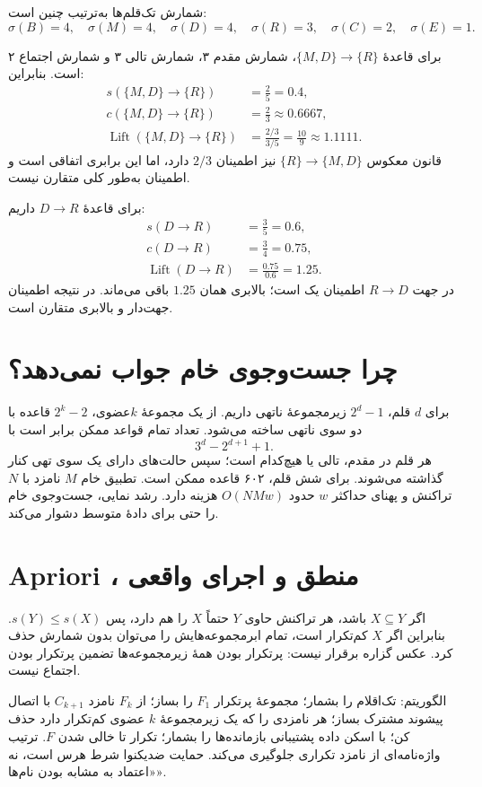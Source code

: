 شمارش تک‌قلم‌ها به‌ترتیب چنین است:
\[\sigma(B)=4,\quad\sigma(M)=4,\quad\sigma(D)=4,\quad\sigma(R)=3,\quad\sigma(C)=2,\quad\sigma(E)=1.\]

برای قاعدهٔ $\{M,D\}\to\{R\}$، شمارش مقدم ۳، شمارش تالی ۳ و شمارش اجتماع ۲ است. بنابراین:
\begin{align*}
s(\{M,D\}\to\{R\})&=\frac25=0.4,\\
c(\{M,D\}\to\{R\})&=\frac23\approx0.6667,\\
\operatorname{Lift}(\{M,D\}\to\{R\})&=\frac{2/3}{3/5}=\frac{10}{9}\approx1.1111.
\end{align*}
قانون معکوس $\{R\}\to\{M,D\}$ نیز اطمینان $2/3$ دارد، اما این برابری اتفاقی است و اطمینان به‌طور کلی متقارن نیست.

برای قاعدهٔ $D\to R$ داریم:
\begin{align*}
s(D\to R)&=\frac35=0.6,\\
c(D\to R)&=\frac34=0.75,\\
\operatorname{Lift}(D\to R)&=\frac{0.75}{0.6}=1.25.
\end{align*}
در جهت $R\to D$ اطمینان یک است؛ بالابری همان $1.25$ باقی می‌ماند. در نتیجه اطمینان جهت‌دار و بالابری متقارن است.

\section{چرا جست‌وجوی خام جواب نمی‌دهد؟}

برای $d$ قلم، $2^d-1$ زیرمجموعهٔ ناتهی داریم. از یک مجموعهٔ $k$عضوی، $2^k-2$ قاعده با دو سوی ناتهی ساخته می‌شود. تعداد تمام قواعد ممکن برابر است با
\[3^d-2^{d+1}+1.\]
هر قلم در مقدم، تالی یا هیچ‌کدام است؛ سپس حالت‌های دارای یک سوی تهی کنار گذاشته می‌شوند. برای شش قلم، ۶۰۲ قاعده ممکن است. تطبیق خام $M$ نامزد با $N$ تراکنش و پهنای حداکثر $w$ حدود $O(NMw)$ هزینه دارد. رشد نمایی، جست‌وجوی خام را حتی برای دادهٔ متوسط دشوار می‌کند.

\section{Apriori ، منطق و اجرای واقعی}

اگر $X\subseteq Y$ باشد، هر تراکنش حاوی $Y$ حتماً $X$ را هم دارد، پس $s(Y)\le s(X)$. بنابراین اگر $X$ کم‌تکرار است، تمام ابرمجموعه‌هایش را می‌توان بدون شمارش حذف کرد. عکس گزاره برقرار نیست: پرتکرار بودن همهٔ زیرمجموعه‌ها تضمین پرتکرار بودن اجتماع نیست.

الگوریتم: تک‌اقلام را بشمار؛ مجموعهٔ پرتکرار $F_1$ را بساز؛ از $F_k$ نامزد $C_{k+1}$ با اتصال پیشوند مشترک بساز؛ هر نامزدی را که یک زیرمجموعهٔ $k$ عضوی کم‌تکرار دارد حذف کن؛ با اسکن داده پشتیبانی بازمانده‌ها را بشمار؛ تکرار تا خالی شدن $F$. ترتیب واژه‌نامه‌ای از نامزد تکراری جلوگیری می‌کند. حمایت ضدیکنوا شرط هرس است، نه «اعتماد به مشابه بودن نام‌ها».

